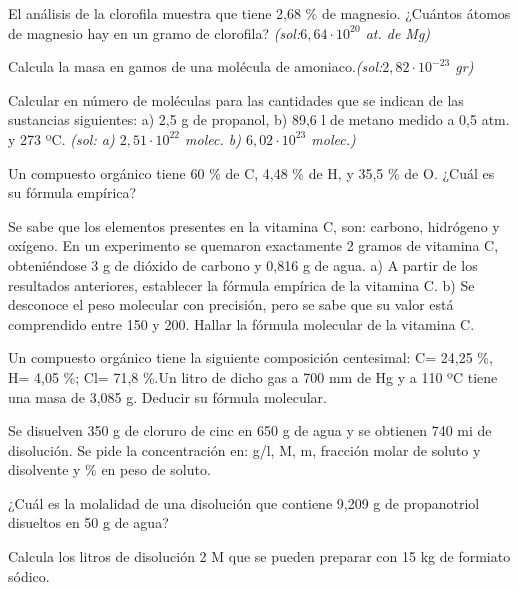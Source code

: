 \begin{problem}
El análisis de la clorofila muestra que tiene 2,68 \% de magnesio. ¿Cuántos átomos de magnesio hay en un gramo de clorofila? \textit{\scriptsize(sol:$6,64\cdot10^{20}$ at. de Mg)}
\end{problem}
\begin{problem}
Calcula la masa en gamos de una molécula de amoniaco.\textit{\scriptsize(sol:$2,82\cdot10^{-23}$ gr)}
\end{problem}
\begin{problem}
Calcular en número de moléculas para las cantidades que se indican de las sustancias siguientes: a) 2,5 g de propanol, b) 89,6 l de metano medido a 0,5 atm. y 273 ºC. \textit{\scriptsize(sol: a) $2,51\cdot10^{22}$ molec. b) $6,02\cdot10^{23}$ molec.)}
\end{problem}
\begin{problem}
Un compuesto orgánico tiene 60 \% de C, 4,48 \% de H, y 35,5 \% de O. ¿Cuál es su fórmula empírica?
\end{problem}
\begin{problem}
Se sabe que los elementos presentes en la vitamina C, son: carbono, hidrógeno y oxígeno. En un experimento se quemaron exactamente 2 gramos de vitamina C, obteniéndose 3 g de dióxido de carbono y 0,816 g de agua.
a)	A partir de los resultados anteriores, establecer la fórmula empírica de la vitamina C.
b)	Se desconoce el peso molecular con precisión, pero se sabe que su valor está comprendido entre 150 y 200. Hallar la fórmula molecular de la vitamina C.
\end{problem}
\begin{problem}
Un compuesto orgánico tiene la siguiente composición centesimal: C= 24,25 \%, H= 4,05 \%; Cl= 71,8 \%.Un litro de dicho gas a 700 mm de Hg y a 110 ºC tiene una masa de 3,085 g. Deducir su fórmula molecular.
\end{problem}
\begin{problem}
Se disuelven 350 g de cloruro de cinc en 650 g de agua y se obtienen 740 mi de disolución. Se pide la concentración en: g/l, M, m, fracción molar de soluto y disolvente y \% en peso de soluto.
\end{problem}
\begin{problem}
¿Cuál es la molalidad de una disolución que contiene 9,209 g de propanotriol disueltos en 50 g de agua?
\end{problem}
\begin{problem}
Calcula los litros de disolución 2 M que se pueden preparar con 15 kg de formiato sódico.
\end{problem}
